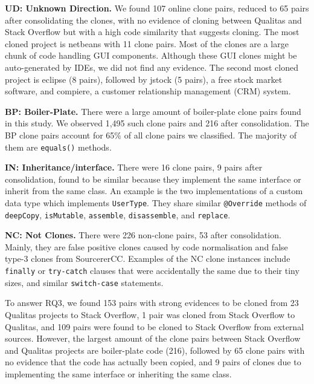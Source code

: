 \documentclass[10pt,journal,compsoc]{IEEEtran}
\newenvironment{boxquote}{\vspace{-1ex}\setlength{\FrameSep}{1\fboxsep}\begin{framed}\setlength{\parskip}{0.5\baselineskip}\setlength{\parindent}{0pt}}{\end{framed}}
\begin{document}

\textbf{UD: Unknown Direction.} We found 107 online clone pairs, reduced to 65
pairs after consolidating the clones, with no evidence of cloning between Qualitas
and Stack Overflow but with a high code similarity that suggests cloning. 
The most cloned project is \textsf{netbeans} with 11 clone pairs. Most of the
clones are a large chunk of code handling GUI components. Although these GUI
clones might be auto-generated by IDEs, we did not find any evidence. The second
most cloned project is \textsf{eclipse} (8 pairs), followed by
\textsf{jstock}  (5 pairs),
a free stock market software, and \textsf{compiere}, a customer
relationship management (CRM) system.

\textbf{BP: Boiler-Plate.} There were a large amount of boiler-plate clone pairs
found in this study. We observed 1,495 such clone pairs and 216 after
consolidation. The BP clone pairs account for 65\% of all clone pairs we
classified. The majority of them are {\small{\texttt{equals()}}} methods.

\textbf{IN: Inheritance/interface.} There were 16 clone pairs, 9 pairs after
consolidation, found to be similar because they implement the same interface or
inherit from the same class. An example is the two implementations of a
custom data type which implements {\small\texttt{UserType}}. They share similar
{\small\texttt{@Override}} methods of {\small\texttt{deepCopy}},
{\small\texttt{isMutable}}, {\small\texttt{assemble}},
{\small\texttt{disassemble}}, and {\small\texttt{replace}}.

\textbf{NC: Not Clones.} There were 226 non-clone
pairs, 53 after consolidation. Mainly, they are false positive clones caused by code
normalisation and false type-3 clones from SourcererCC. 
Examples of the NC clone instances include {\small\texttt{finally}} or
{\small\texttt{try-catch}} clauses that were accidentally the same due
to their tiny sizes, and similar {\small\texttt{switch-case}}
statements.

\begin{boxquote}
To answer RQ3, we found 153 pairs with
strong evidences to be cloned from 23 Qualitas projects to Stack Overflow, 1 pair
was cloned from Stack Overflow to Qualitas, and
109 pairs were found to be cloned to Stack Overflow from external
sources. However, the largest amount of the clone pairs
between Stack Overflow and Qualitas projects are \linebreak boiler-plate code
(216), followed by 65 clone pairs with no evidence that the code has actually been copied,
and 9 pairs of clones due to implementing the same interface or inheriting the same class.
\end{boxquote}
\end{document}
